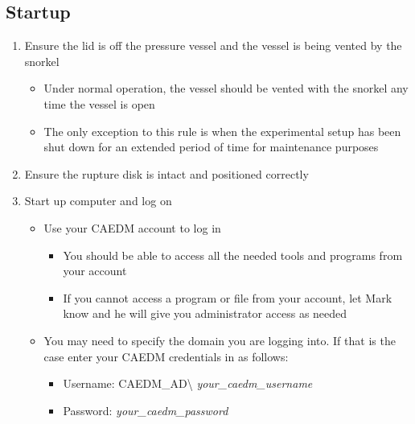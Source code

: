 \documentclass[letterpaper,11pt]{article}
\begin{document}
    \subsection{Startup}
    
    \begin{enumerate}
    \item Ensure the lid is off the pressure vessel and the vessel is being 
        vented by the snorkel
        \begin{itemize}
        \item Under normal operation, the vessel should be vented with the 
            snorkel any time the vessel is open
        \item The only exception to this rule is when the experimental setup has
            been shut down for an extended period of time for maintenance 
            purposes
        \end{itemize}
	\item Ensure the rupture disk is intact and positioned correctly
    \item Start up computer and log on
        \begin{itemize}
      
        \item Use your CAEDM account to log in
            \begin{itemize}
            \item You should be able to access all the needed tools and 
                programs from your account
            \item If you cannot access a program or file from your account, let 
                Mark know and he will give you administrator access as needed
            \end{itemize}
        
        \item You may need to specify the domain you are logging into. If that 
            is the case enter your CAEDM credentials in as follows:
            \begin{itemize}
            \item Username: CAEDM\_AD\textbackslash
            \textit{your\_caedm\_username}
            \item Password: \textit{your\_caedm\_password}
            \end{itemize}
        
        

\end{itemize}
\end{enumerate}
\end{document}
